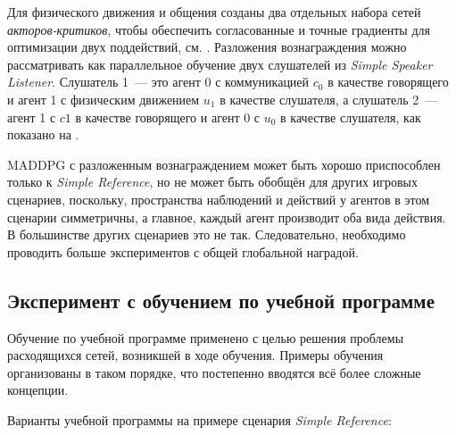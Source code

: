 Для физического движения и общения созданы два отдельных набора сетей \textit{акторов-критиков}, чтобы обеспечить согласованные и точные градиенты для оптимизации двух поддействий, см. . Разложения вознаграждения можно рассматривать как параллельное обучение двух слушателей из \textit{Simple Speaker Listener}. Слушатель 1~--- это агент 0 с коммуникацией $c_0$ в качестве говорящего и агент 1 с физическим движением $u_1$ в качестве слушателя, а слушатель 2~--- агент 1 с $c1$ в качестве говорящего и агент 0 с $u_0$ в качестве слушателя, как показано на .

MADDPG с разложенным вознаграждением может быть хорошо приспособлен только к \textit{Simple Reference}, но не может быть обобщён для других игровых сценариев, поскольку, пространства наблюдений и действий у агентов в этом сценарии симметричны, а главное, каждый агент производит оба вида действия. В большинстве других сценариев это не так. Следовательно, необходимо проводить больше экспериментов с общей глобальной наградой.

\subsection{Эксперимент с обучением по учебной программе}

Обучение по учебной программе применено с целью решения проблемы расходящихся сетей, возникшей в ходе обучения. Примеры обучения организованы в таком порядке, что постепенно вводятся всё более сложные концепции.

Варианты учебной программы на примере сценария \textit{Simple Reference}:

